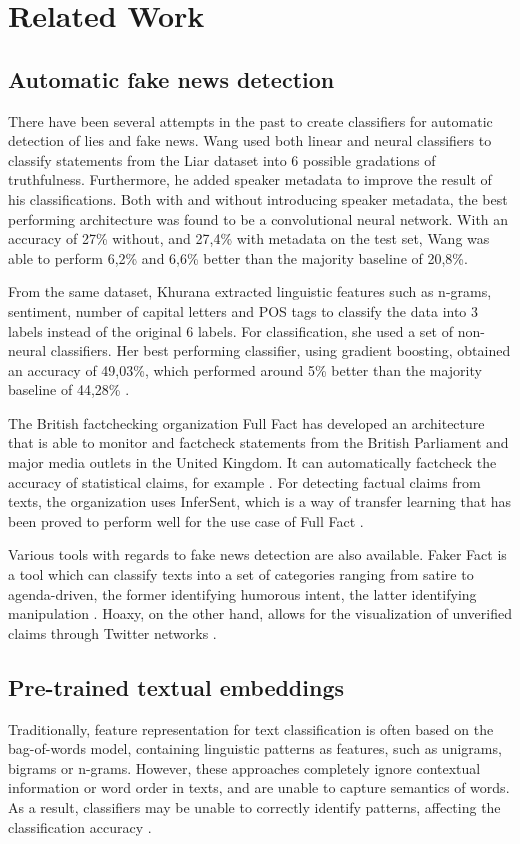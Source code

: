 \section{Related Work}
\subsection{Automatic fake news detection}
There have been several attempts in the past to create classifiers for automatic detection of lies and fake news. 
Wang used both linear and neural classifiers to classify statements from the Liar dataset into 6 possible gradations of truthfulness. 
Furthermore, he added speaker metadata to improve the result of his classifications.
Both with and without introducing speaker metadata, the best performing architecture was found to be a convolutional neural network. 
With an accuracy of 27\% without, and 27,4\% with metadata on the test set, Wang was able to perform 6,2\% and 6,6\% better than the majority baseline of 20,8\%\cite{wang2018}.

From the same dataset, Khurana extracted linguistic features such as n-grams, sentiment, number of capital letters and POS tags to classify the data into 3 labels instead of the original 6 labels. 
For classification, she used a set of non-neural classifiers. 
Her best performing classifier, using gradient boosting, obtained an accuracy of 49,03\%, which performed around 5\% better than the majority baseline of 44,28\% \cite{khurana2017}.

The British factchecking organization Full Fact has developed an architecture that is able to monitor and factcheck statements from the British Parliament and major media outlets in the United Kingdom. 
It can automatically factcheck the accuracy of statistical claims, for example \cite{babakar2016}.
For detecting factual claims from texts, the organization uses InferSent, which is a way of transfer learning that has been proved to perform well for the use case of Full Fact \cite{pydata2018}.

Various tools with regards to fake news detection are also available. 
Faker Fact is a tool which can classify texts into a set of categories ranging from satire to agenda-driven, the former identifying humorous intent, the latter identifying manipulation \cite{fakerfact}. 
Hoaxy, on the other hand, allows for the visualization of unverified claims through Twitter networks \cite{shao2016}.

\subsection{Pre-trained textual embeddings}
Traditionally, feature representation for text classification is often based on the bag-of-words model, containing linguistic patterns as features, such as unigrams, bigrams or n-grams.
However, these approaches completely ignore contextual information or word order in texts, and are unable to capture semantics of words. 
As a result, classifiers may be unable to correctly identify patterns, affecting the classification accuracy \cite{lai2015}.

